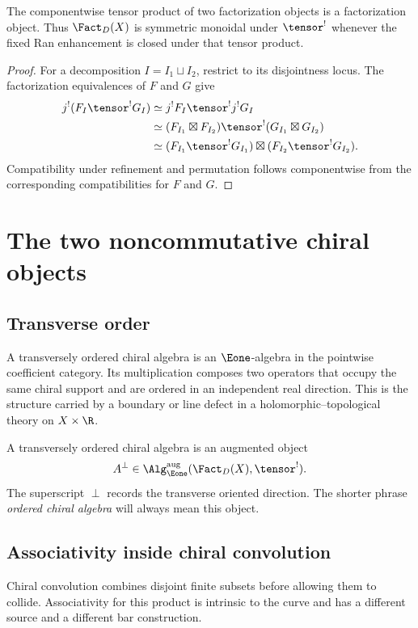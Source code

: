 \begin{proposition}
The componentwise tensor product of two factorization objects is a factorization object. Thus $\Fact_D(X)$ is symmetric monoidal under $\tensor^!$ whenever the fixed Ran enhancement is closed under that tensor product.
\end{proposition}
\begin{proof}
For a decomposition $I=I_1\sqcup I_2$, restrict to its disjointness locus. The factorization equivalences of $F$ and $G$ give
\[
\begin{aligned}
 j^!(F_I\tensor^!G_I)
 &\simeq j^!F_I\tensor^!j^!G_I\\
 &\simeq (F_{I_1}\boxtimes F_{I_2})\tensor^!
          (G_{I_1}\boxtimes G_{I_2})\\
 &\simeq (F_{I_1}\tensor^!G_{I_1})\boxtimes
          (F_{I_2}\tensor^!G_{I_2}).
\end{aligned}
\]
Compatibility under refinement and permutation follows componentwise from the corresponding compatibilities for $F$ and $G$.
\end{proof}


\chapter{The two noncommutative chiral objects}
\section{Transverse order}
A transversely ordered chiral algebra is an $\Eone$-algebra in the pointwise coefficient category.  Its multiplication composes two operators that occupy the same chiral support and are ordered in an independent real direction.  This is the structure carried by a boundary or line defect in a holomorphic--topological theory on $X\times\R$.

\begin{definition}
A transversely ordered chiral algebra is an augmented object
\[
 A^\perp\in\Alg_{\Eone}^{\mathrm{aug}}(\Fact_D(X),\tensor^!).
\]
The superscript $\perp$ records the transverse oriented direction.  The shorter phrase \emph{ordered chiral algebra} will always mean this object.
\end{definition}

\section{Associativity inside chiral convolution}
Chiral convolution combines disjoint finite subsets before allowing them to collide.  Associativity for this product is intrinsic to the curve and has a different source and a different bar construction.

